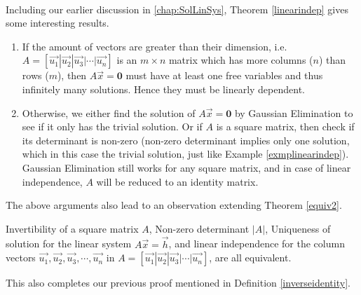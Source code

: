 \\
Including our earlier discussion in \autoref{chap:SolLinSys}, Theorem \ref{linearindep} gives some interesting results.
\begin{enumerate}
\item If the amount of vectors are greater than their dimension, i.e. 
$A = [\vec{u_1}|\vec{u_2}|\vec{u_3}|\cdots|\vec{u_n}]$ is an $m \times n$ matrix which has more columns ($n$) than rows ($m$), then $A\vec{x} = \textbf{0}$ must have at least one free variables and thus infinitely many solutions. Hence they must be linearly dependent.
\item Otherwise, we either find the solution of $A\vec{x} = \textbf{0}$ by Gaussian Elimination to see if it only has the trivial solution. Or if $A$ is a square matrix, then check if its determinant is non-zero (non-zero determinant implies only one solution, which in this case the trivial solution, just like Example \ref{exmplinearindep}). Gaussian Elimination still works for any square matrix, and in case of linear independence, $A$ will be reduced to an identity matrix.
\end{enumerate}
The above arguments also lead to an observation extending Theorem \ref{equiv2}.
\begin{thm}
\label{equiv3}
Invertibility of a square matrix $A$, Non-zero determinant $|A|$, Uniqueness of solution for the linear system $A\vec{x} = \vec{h}$, and linear independence for the column vectors $\vec{u_1}, \vec{u_2}, \vec{u_3}, \cdots, \vec{u_n}$ in $A = [\vec{u_1}|\vec{u_2}|\vec{u_3}|\cdots|\vec{u_n}]$, are all equivalent.
\end{thm}
This also completes our previous proof mentioned in Definition \ref{inverseidentity}.

